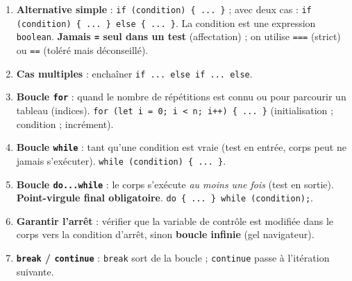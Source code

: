 \documentclass[11pt]{article}
\begin{document}
\begin{methode}
\begin{enumerate}
\item \textbf{Alternative simple} : \texttt{if (condition) \{ ... \}} ; avec deux cas : \texttt{if (condition) \{ ... \} else \{ ... \}}. La condition est une expression \texttt{boolean}. \textbf{Jamais \texttt{=} seul dans un test} (affectation) ; on utilise \texttt{===} (strict) ou \texttt{==} (toléré mais déconseillé).
\item \textbf{Cas multiples} : enchaîner \texttt{if ... else if ... else}.
\item \textbf{Boucle \texttt{for}} : quand le nombre de répétitions est connu ou pour parcourir un tableau (indices).
      \texttt{for (let i = 0; i < n; i++) \{ ... \}} \quad (initialisation ; condition ; incrément).
\item \textbf{Boucle \texttt{while}} : tant qu'une condition est vraie (test en entrée, corps peut ne jamais s'exécuter).
      \texttt{while (condition) \{ ... \}}.
\item \textbf{Boucle \texttt{do...while}} : le corps s'exécute \emph{au moins une fois} (test en sortie). \textbf{Point-virgule final obligatoire}.
      \texttt{do \{ ... \} while (condition);}.
\item \textbf{Garantir l'arrêt} : vérifier que la variable de contrôle est modifiée dans le corps vers la condition d'arrêt, sinon \textbf{boucle infinie} (gel navigateur).
\item \textbf{\texttt{break} / \texttt{continue}} : \texttt{break} sort de la boucle ; \texttt{continue} passe à l'itération suivante.
\end{enumerate}
\end{methode}
\end{document}
